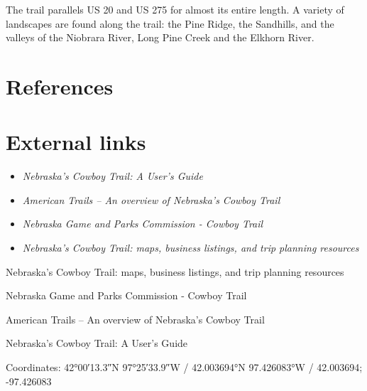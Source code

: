 The trail parallels US 20 and US 275 for almost its entire length. A
variety of landscapes are found along the trail: the Pine Ridge, the
Sandhills, and the valleys of the Niobrara River, Long Pine Creek and
the Elkhorn River.

\section{References}\label{references}

\section{External links}\label{external-links}

\begin{itemize}
\item
  \emph{Nebraska's Cowboy Trail: A User's Guide}
\item
  \emph{American Trails -- An overview of Nebraska's Cowboy Trail}
\item
  \emph{Nebraska Game and Parks Commission - Cowboy Trail}
\item
  \emph{Nebraska's Cowboy Trail: maps, business listings, and trip
  planning resources}
\end{itemize}

Nebraska's Cowboy Trail: maps, business listings, and trip planning
resources

Nebraska Game and Parks Commission - Cowboy Trail

American Trails -- An overview of Nebraska's Cowboy Trail

Nebraska's Cowboy Trail: A User's Guide

Coordinates: 42°00′13.3″N 97°25′33.9″W﻿ / ﻿42.003694°N 97.426083°W﻿ /
42.003694; -97.426083
